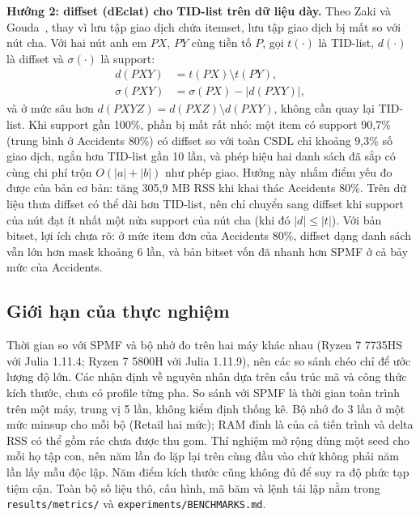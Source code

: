 \textbf{Hướng 2: diffset (dEclat) cho TID-list trên dữ liệu dày.} Theo Zaki và Gouda~\cite{zaki2003fast}, thay
vì lưu tập giao dịch chứa itemset, lưu tập giao dịch bị mất so với nút cha. Với hai nút anh em $PX$, $PY$ cùng
tiền tố $P$, gọi $t(\cdot)$ là TID-list, $d(\cdot)$ là diffset và $\sigma(\cdot)$ là support:
\begin{equation}
\begin{aligned}
d(PXY) &= t(PX) \setminus t(PY),\\
\sigma(PXY) &= \sigma(PX) - |d(PXY)|,
\end{aligned}
\label{eq:diffset}
\end{equation}
và ở mức sâu hơn $d(PXYZ) = d(PXZ) \setminus d(PXY)$, không cần quay lại TID-list. Khi support gần 100\%, phần
bị mất rất nhỏ: một item có support 90,7\% (trung bình ở Accidents 80\%) có diffset so với toàn CSDL chỉ khoảng
9,3\% số giao dịch, ngắn hơn TID-list gần 10 lần, và phép hiệu hai danh sách đã sắp có cùng chi phí trộn
$O(|a| + |b|)$ như phép giao. Hướng này nhắm điểm yếu đo được của bản cơ bản: tăng 305,9 MB RSS khi khai thác
Accidents 80\%. Trên dữ liệu thưa diffset có thể dài hơn TID-list, nên chỉ chuyển sang diffset khi support của
nút đạt ít nhất một nửa support của nút cha (khi đó $|d| \le |t|$). Với bản bitset, lợi ích chưa rõ: ở mức item
đơn của Accidents 80\%, diffset dạng danh sách vẫn lớn hơn mask khoảng 6 lần, và bản bitset vốn đã nhanh hơn SPMF
ở cả bảy mức của Accidents.

\subsection{Giới hạn của thực nghiệm}

Thời gian so với SPMF và bộ nhớ đo trên hai máy khác nhau (Ryzen 7 7735HS với Julia 1.11.4; Ryzen 7 5800H với
Julia 1.11.9), nên các so sánh chéo chỉ để ước lượng độ lớn. Các nhận định về nguyên nhân dựa trên cấu trúc mã
và công thức kích thước, chưa có profile từng pha. So sánh với SPMF là thời gian toàn trình trên một máy, trung
vị 5 lần, không kiểm định thống kê. Bộ nhớ đo 3 lần ở một mức minsup cho mỗi bộ (Retail hai mức); RAM đỉnh là
của cả tiến trình và delta RSS có thể gồm rác chưa được thu gom. Thí nghiệm mở rộng dùng một seed cho mỗi họ tập
con, nên năm lần đo lặp lại trên cùng đầu vào chứ không phải năm lần lấy mẫu độc lập. Năm điểm kích thước cũng
không đủ để suy ra độ phức tạp tiệm cận. Toàn bộ số liệu thô, cấu hình, mã băm và lệnh tái lập nằm
trong \texttt{results/metrics/} và \texttt{experiments/BENCHMARKS.md}.

